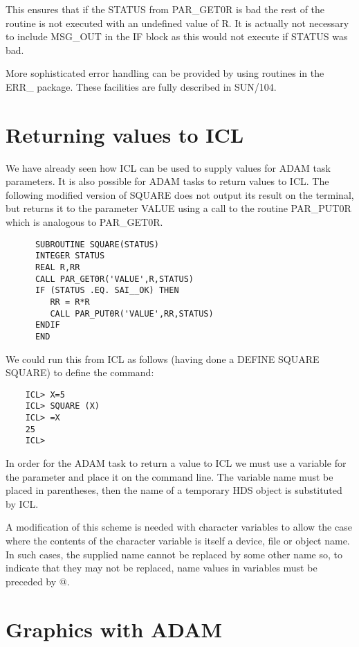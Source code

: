 \documentclass[twoside,11pt]{report}
\newcommand{\xlabel}[1]{}
\begin{document}
This ensures that if the STATUS from PAR\_GET0R is bad the rest of the routine
is not executed with an undefined value of R. It is actually not necessary
to include MSG\_OUT in the IF block as this would not execute if STATUS was
bad.                  

More sophisticated error handling can be provided by using routines in the
ERR\_ package. These facilities are fully described in SUN/104.

\section{\xlabel{returning_values_to_icl}Returning values to ICL}
\label{retval}
We have already seen how ICL can be used to supply values for ADAM task
parameters. It is also possible for ADAM tasks to return values to ICL.
The following modified version of SQUARE does not output its result on the
terminal, but returns it to the parameter VALUE using a call to the routine
PAR\_PUT0R which is analogous to PAR\_GET0R.

\begin{verbatim}
      SUBROUTINE SQUARE(STATUS)
      INTEGER STATUS
      REAL R,RR
      CALL PAR_GET0R('VALUE',R,STATUS)
      IF (STATUS .EQ. SAI__OK) THEN      
         RR = R*R           
         CALL PAR_PUT0R('VALUE',RR,STATUS)
      ENDIF
      END
\end{verbatim}                            

We could run this from ICL as follows (having done a DEFINE SQUARE SQUARE)
to define the command:

\begin{verbatim}
    ICL> X=5
    ICL> SQUARE (X)
    ICL> =X
    25
    ICL>
\end{verbatim}

In order for the ADAM task to return a value to ICL we must use a variable
for the parameter and place it on the command line. The variable name must
be placed in parentheses, then the name of a temporary HDS object is 
substituted by ICL.

A modification of this scheme is needed with character variables to allow the
case where the contents of the character variable is itself a device, file or 
object name. 
In such cases, the supplied name cannot be replaced by some other name so, 
to indicate that they may not be replaced, name values in variables must be 
preceded by @.

\section{\xlabel{graphics_with_adam_}Graphics with ADAM}                                                
\end{document}
